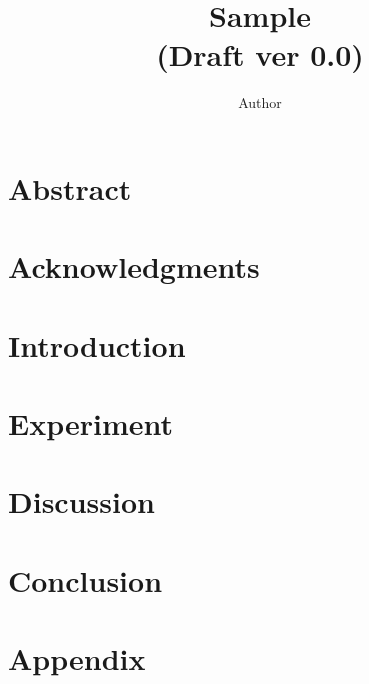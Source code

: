\documentclass[dvipdfmx,12pt,a4paper,openany]{book}
\begin{document}
\title{Sample\\
(Draft ver 0.0)}
\author{Author}
\maketitle

\frontmatter
\chapter{Abstract}

\chapter{Acknowledgments}

\tableofcontents

\mainmatter
\chapter{Introduction}

\chapter{Experiment}

\chapter{Discussion}

\chapter{Conclusion}




\backmatter
\chapter{Appendix}

\end{document}
